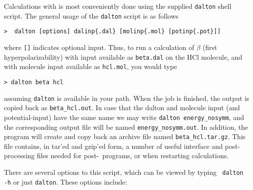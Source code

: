Calculations with {\dalton} is most conveniently done using the
supplied \verb|dalton| shell script.
The general usage of the \verb|dalton| script is as follows
\begin{verbatim}
>  dalton [options] dalinp{.dal} [molinp{.mol} [potinp{.pot}]]
\end{verbatim}
where \verb|[]| indicates optional input.
Thus, to run a calculation of $\beta$ (first
hyperpolarizability) 
with input available as \verb|beta.dal| on the HCl molecule, and with
molecule input available as \verb|hcl.mol|, you would type
\begin{verbatim}
> dalton beta hcl
\end{verbatim}
assuming \verb|dalton| is available in your path. When the job is
finished, the output is copied back as \verb|beta_hcl.out|. In case that the
dalton and molecule input (and potential-input) have the same name we may write
\verb|dalton energy_nosymm|, and the corresponding output file will
be named \verb|energy_nosymm.out|. In addition, the program will create and copy
back an archive file named \verb|beta_hcl.tar.gz|. This file contains, in
tar'ed and gzip'ed form, a number of useful interface and
post-processing files needed for post-\dalton\ programs, or when
restarting calculations.

There are several options to this script,
which can be viewed by typing \verb| dalton -h| or just \verb|dalton|.
These options include:

